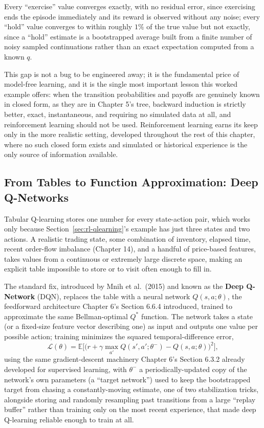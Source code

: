 \documentclass[../ai_in_finance]{subfiles}
\begin{document}
Every ``exercise'' value converges exactly, with no residual error, since exercising ends the episode
immediately and its reward is observed without any noise; every ``hold'' value converges to within roughly $1\%$ of the true value but
not exactly, since a ``hold'' estimate is a bootstrapped average built from a finite number of noisy sampled continuations rather than
an exact expectation computed from a known $q$.

This gap is not a bug to be engineered away; it is the fundamental price of model-free
learning, and it is the single most important lesson this worked example offers: when the transition probabilities and payoffs are
genuinely known in closed form, as they are in Chapter 5's tree, backward induction is strictly better, exact, instantaneous,
and requiring no simulated data at all, and reinforcement learning should not be used. Reinforcement learning earns its keep only
in the more realistic setting, developed throughout the rest of this chapter, where no such closed form exists and simulated or
historical experience is the only source of information available.

\subsection{From Tables to Function Approximation: Deep Q-Networks}
\label{sec:dqn}

Tabular Q-learning stores one number for every state-action pair, which works only because Section~\ref{sec:rl-qlearning}'s example has just three states and two actions. A realistic trading state, some combination of inventory, elapsed time, recent order-flow imbalance (Chapter 14), and a handful of price-based features, takes values from a continuous or extremely large discrete space, making an explicit table impossible to store or to visit often enough to fill in.

The standard fix, introduced by Mnih et al.\ (2015) and known as the \textbf{Deep Q-Network} (DQN), replaces the table with a neural network $Q(s,a;\theta)$, the feedforward architecture Chapter 6's Section 6.6.4 introduced, trained to approximate the same Bellman-optimal $Q^*$ function. The network takes a state (or a fixed-size feature vector describing one) as input and outputs one value per possible action; training minimizes the squared temporal-difference error,
\begin{equation*}
\mathcal{L}(\theta) = \mathbb{E}\Big[\big(r + \gamma \max_{a'} Q(s',a';\theta^-) - Q(s,a;\theta)\big)^2\Big],
\end{equation*}
using the same gradient-descent machinery Chapter 6's Section 6.3.2 already developed for supervised learning, with $\theta^-$ a periodically-updated copy of the network's own parameters (a ``target network'') used to keep the bootstrapped target from chasing a constantly-moving estimate, one of two stabilization tricks, alongside storing and randomly resampling past transitions from a large ``replay buffer'' rather than training only on the most recent experience, that made deep Q-learning reliable enough to train at all.
\end{document}
